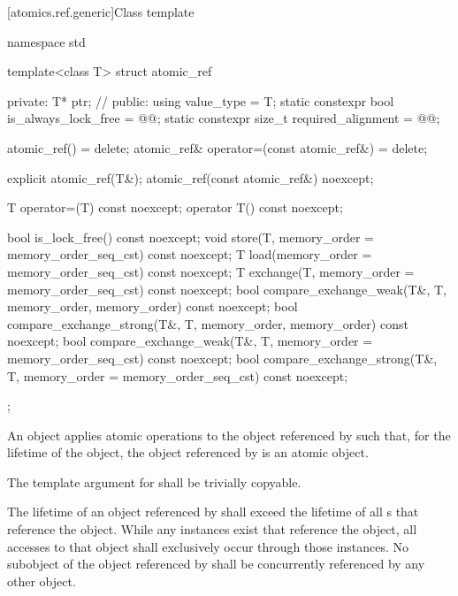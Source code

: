 [atomics.ref.generic]{Class template }

%
%
\begin{codeblock}
namespace std {
  template<class T> struct atomic_ref {
  private:
    T* ptr;             // \expos
  public:
    using value_type = T;
    static constexpr bool is_always_lock_free = @@;
    static constexpr size_t required_alignment = @@;

    atomic_ref() = delete;
    atomic_ref& operator=(const atomic_ref&) = delete;

    explicit atomic_ref(T&);
    atomic_ref(const atomic_ref&) noexcept;

    T operator=(T) const noexcept;
    operator T() const noexcept;

    bool is_lock_free() const noexcept;
    void store(T, memory_order = memory_order_seq_cst) const noexcept;
    T load(memory_order = memory_order_seq_cst) const noexcept;
    T exchange(T, memory_order = memory_order_seq_cst) const noexcept;
    bool compare_exchange_weak(T&, T,
                               memory_order, memory_order) const noexcept;
    bool compare_exchange_strong(T&, T,
                                 memory_order, memory_order) const noexcept;
    bool compare_exchange_weak(T&, T,
                               memory_order = memory_order_seq_cst) const noexcept;
    bool compare_exchange_strong(T&, T,
                                 memory_order = memory_order_seq_cst) const noexcept;
  };
}
\end{codeblock}

\pnum
An  object applies atomic operations to
the object referenced by  such that,
for the lifetime of the  object,
the object referenced by  is an atomic object.

\pnum
The template argument for 
shall be trivially copyable.

\pnum
The lifetime of an object referenced by 
shall exceed the lifetime of all s that reference the object.
While any  instances exist
that reference the  object,
all accesses to that object shall exclusively occur
through those  instances.
No subobject of the object referenced by 
shall be concurrently referenced by any other  object.

